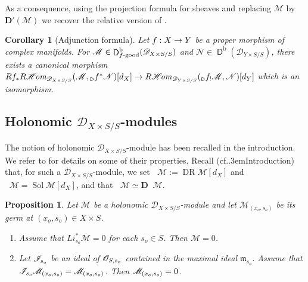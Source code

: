 \documentclass[english]{smfart}
\numberwithin{subsection}{section}
\def\shd{\mathcal{D}}\let\cD\shd
\def\shm{\mathcal{M}}
\def\shn{\mathcal{N}}\let\shn\shn
\newcommand{\bD}{\boldsymbol{D}}
\newcommand{\Rhom}{R\shhom}
\newcommand{\shhom}{\mathcal{H}\!\mathit{om}}\let\ho\shhom
\newcommand{\rb}{\mathrm{b}}
\newcommand{\XS}{X\times S}
\newcommand{\DXS}{\shd_{\XS/S}}
\newcommand{\DYS}{\shd_{Y\times S/S}}
\DeclareMathOperator{\rD}{\mathsf{D}}
\DeclareMathOperator{\DR}{DR}
\DeclareMathOperator{\pDR}{{}^\mathrm{p}DR}
\DeclareMathOperator{\Sol}{Sol}
\DeclareMathOperator{\pSol}{{}^\mathrm{p}Sol}
\def\cf{cf.\kern.3em}
\newcommand{\Df}{{}_{\scriptscriptstyle\mathrm{D}}f}
\numberwithin{equation}{section}
\theoremstyle{plain}
\newtheorem{proposition}[equation]{Proposition}
\newtheorem{corollary}[equation]{Corollary}
\theoremstyle{definition}
\def\to{\mathchoice{\longrightarrow}{\rightarrow}{\rightarrow}{\rightarrow}}
\begin{document}
As a consequence, using the projection formula for sheaves and replacing $\shm$ by $\bD'(\shm)$ we recover the relative version of \cite[Th.\,4.33]{Kashiwara03}.

\begin{corollary}[Adjunction formula]\label{C:rel3}
Let $f:X\to Y$ be a proper morphism of complex manifolds. For $\shm\in\rD^\rb_{f\textup{-good}}(\DXS)$ and $\shn\in \rD^\rb(\DYS)$, there exists a canonical morphism $Rf_*\Rhom_{\DXS}(\shm,\Df^*\shn)[d_X]\to \Rhom_{\DYS}(\Df_!\shm, \shn)[d_Y]$ which is an isomorphism.
\end{corollary}

\subsection{Holonomic \texorpdfstring{$\DXS$}{DXS}-modules}

The notion of holonomic $\DXS$-module has been recalled in the introduction. We refer to \cite{MF-S12} for details on some of their properties. Recall (\cf Introduction) that, for such a $\DXS$-module, we set $\pDR\shm:=\DR\shm[d_X]$ and $\pSol\shm=\Sol\shm[d_X]$, and that $\pDR\shm\simeq\bD\pSol\shm$.

\begin{proposition}\label{prop:holLi*0}
Let $\shm$ be a holonomic $\DXS$-module and let $\shm_{(x_o,s_o)}$ be its germ at $(x_o,s_o)\in \XS$.
\begin{enumerate}
\item\label{prop:holLi*01}
Assume that $L i^*_{s_o}\shm=0$ for each $s_o\in S$. Then $\shm=0$.
\item\label{prop:holLi*02}
Let $\cI_{s_o}$ be an ideal of $\cO_{S,s_o}$ contained in the maximal ideal $\mathfrak{m}_{s_o}$. Assume that $\cI_{s_o}\shm_{(x_o,s_o)}=\shm_{(x_o,s_o)}$. Then $\shm_{(x_o,s_o)}=\nobreak0$.
\end{enumerate}
\end{proposition}
\end{document}
